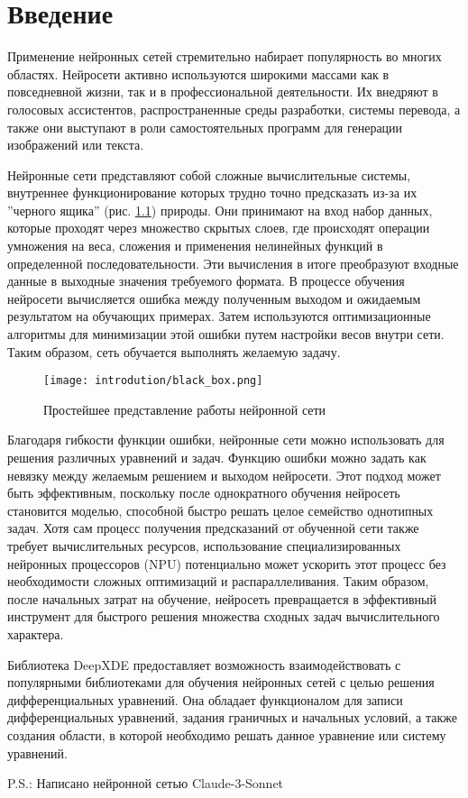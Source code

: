 \chapter{Введение}

Применение нейронных сетей стремительно набирает популярность во многих областях.
Нейросети активно используются широкими массами как в повседневной жизни, так и в
профессиональной деятельности. Их внедряют в голосовых ассистентов, распространенные
среды разработки, системы перевода, а также они выступают в роли самостоятельных
программ для генерации изображений или текста.

Нейронные сети представляют собой сложные вычислительные системы, внутреннее
функционирование которых трудно точно предсказать из-за их ''черного ящика''
(рис. \ref{fig:black_box}) природы. Они принимают на вход набор данных, которые
проходят через множество скрытых слоев, где происходят операции умножения на веса,
сложения и применения нелинейных функций в определенной последовательности.
Эти вычисления в итоге преобразуют входные данные в выходные значения требуемого
формата. В процессе обучения нейросети вычисляется ошибка между полученным выходом
и ожидаемым результатом на обучающих примерах. Затем используются оптимизационные 
алгоритмы для минимизации этой ошибки путем настройки весов внутри сети. 
Таким образом, сеть обучается выполнять желаемую задачу.

\begin{figure}[h]
    \texttt{[image: introdution/black\_box.png]}
    \caption{Простейшее представление работы нейронной сети}
    \label{fig:black_box}
\end{figure}

Благодаря гибкости функции ошибки, нейронные сети можно использовать для решения
различных уравнений и задач. Функцию ошибки можно задать как невязку между желаемым
решением и выходом нейросети. Этот подход может быть эффективным, поскольку после
однократного обучения нейросеть становится моделью, способной быстро решать целое
семейство однотипных задач. Хотя сам процесс получения предсказаний от обученной
сети также требует вычислительных ресурсов, использование специализированных нейронных
процессоров (NPU) потенциально может ускорить этот процесс без необходимости сложных
оптимизаций и распараллеливания. Таким образом, после начальных затрат на обучение,
нейросеть превращается в эффективный инструмент для быстрого решения множества сходных
задач вычислительного характера.

Библиотека DeepXDE \cite{lu2021deepxde} предоставляет возможность взаимодействовать с
популярными библиотеками для обучения нейронных сетей с целью решения дифференциальных
уравнений. Она обладает функционалом для записи дифференциальных уравнений, задания 
граничных и начальных условий, а также создания области, в которой необходимо решать
данное уравнение или систему уравнений.  

P.S.: Написано нейронной сетью Claude-3-Sonnet